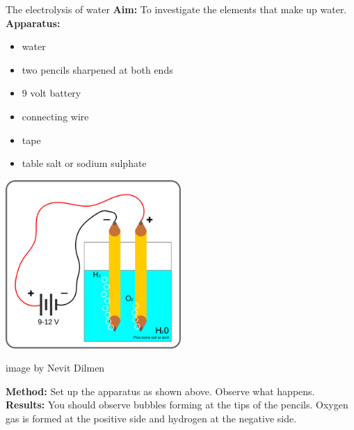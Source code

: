 {}
\begin{g_experiment}{The electrolysis of water}
\textbf{Aim: } To investigate the elements that make up water.\\
\textbf{Apparatus:}\\
\begin{minipage}{.4\textwidth}
\begin{itemize}[noitemsep]
 \item water
\item two pencils sharpened at both ends
\item 9 volt battery
\item connecting wire
\item tape
\item table salt or sodium sulphate
\end{itemize}
\end{minipage}
\begin{minipage}{.6\textwidth} 
\begin{center}
   \includegraphics[width=0.5\textwidth]{photos/electrolysis.png}\\
\begin{caption}image by Nevit Dilmen\end{caption}
\end{center}
\end{minipage} \nopagebreak
\textbf{Method: } Set up the apparatus as shown above. Observe what happens.\\
\textbf{Results: } You should observe bubbles forming at the tips of the pencils. Oxygen gas is formed at the positive side and hydrogen at the negative side. 
\end{g_experiment}
            \nopagebreak
